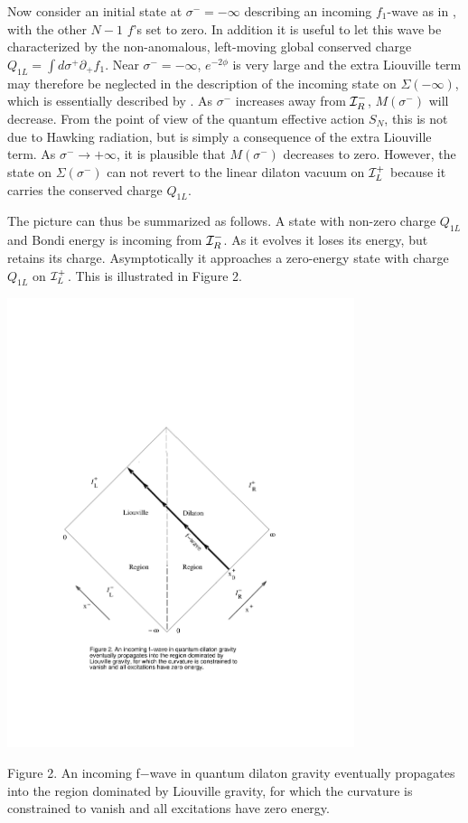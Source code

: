 Now consider an initial state at $\sigma^-=-\infty$ describing an incoming
$f_1$-wave as in \twelve, with the other $N-1$ $f$'s set to zero.
In addition it is useful to let
this wave be characterized by the non-anomalous,
left-moving global conserved charge $Q_{1L}=\int d \sigma^+ \partial_+f_1$.
Near $\sigma^-=-\infty$, $e^{-2\phi}$ is very
large  and the extra Liouville term may therefore be
neglected in the description of the incoming state on $\Sigma (-\infty)$, which
is essentially described by \thirteen.
As $\sigma^-$ increases away from ${\cal I}^-_R$, $M(\sigma^-)$ will
decrease.  From the point of view of the quantum effective action $S_N$,
this is not due to Hawking radiation, but is simply a consequence of the
extra Liouville term.  As $\sigma^-\to +\infty$, it is
plausible that $M(\sigma^-)$ decreases to zero.
However, the state on $\Sigma (\sigma^-)$ can not revert to the linear dilaton
vacuum on ${\cal I}^+_L$ because it carries the conserved charge $Q_{1L}$.

The picture can thus be summarized as  follows.  A state with non-zero
charge $Q_{1L}$ and
Bondi energy is incoming from ${\cal I}^-_R$.  As it evolves it loses its
energy, but retains its charge.  Asymptotically it approaches a
zero-energy state with charge $Q_{1L}$ on ${\cal I}^+_L$. This
is illustrated in Figure 2.
\goodbreak
\topinsert
\centerline{\includegraphics[width=4in]{fig2.pdf}}
\noindent
Figure 2. An incoming f−wave in quantum dilaton gravity eventually propagates into the region dominated by Liouville gravity, for which the curvature is constrained to vanish and all excitations have zero energy.
\endinsert


